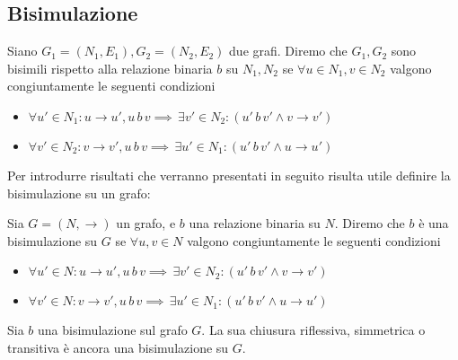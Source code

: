 \subsection{Bisimulazione}
\begin{definition}
    Siano $G_1 = (N_1, E_1), G_2 = (N_2, E_2)$ due grafi. Diremo che $G_1, G_2$ sono bisimili rispetto alla relazione binaria $b$ su $N_1, N_2$ se $\forall u \in N_1, v \in N_2$ valgono congiuntamente le seguenti condizioni
    \begin{itemize}
        \item $\forall u' \in N_1 : u \to u', u \,b\, v \implies \,\exists v' \in N_2 : (u' \,b\, v' \land v \to v')$
        \item $\forall v' \in N_2 : v \to v', u \,b\, v \implies \,\exists u' \in N_1 : (u' \,b\, v' \land u \to u')$
    \end{itemize}
\end{definition}
Per introdurre risultati che verranno presentati in seguito risulta utile definire la bisimulazione su un grafo:
\begin{definition}
    Sia $G = (N, \to)$ un grafo, e $b$ una relazione binaria su $N$. Diremo che $b$ è una bisimulazione su $G$ se $\forall u,v \in N$ valgono congiuntamente le seguenti condizioni
    \begin{itemize}
        \item $\forall u' \in N : u \to u', u \,b\, v \implies \,\exists v' \in N_2 : (u' \,b\, v' \land v \to v')$
        \item $\forall v' \in N : v \to v', u \,b\, v \implies \,\exists u' \in N_1 : (u' \,b\, v' \land u \to u')$
    \end{itemize}
\end{definition}
\begin{proposition}
    Sia $b$ una bisimulazione sul grafo $G$. La sua chiusura riflessiva, simmetrica o transitiva è ancora una bisimulazione su $G$.
\end{proposition}
